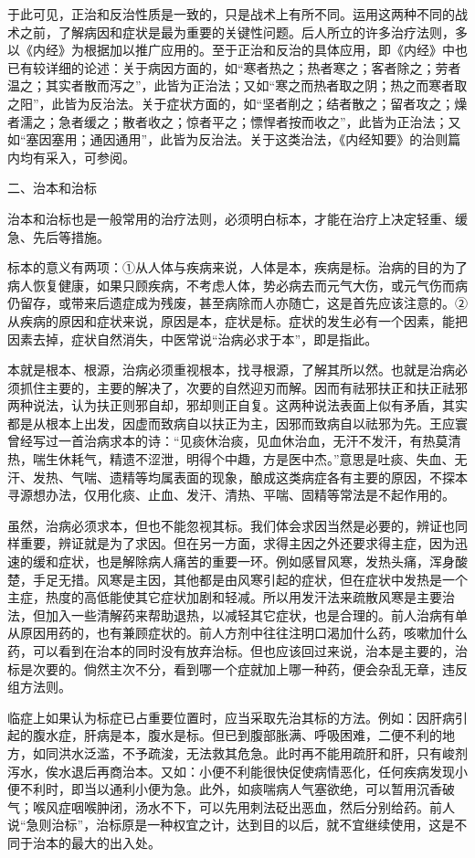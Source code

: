 \documentclass[12pt,UTF8]{ctexbook}
\begin{document}
于此可见，正治和反治性质是一致的，只是战术上有所不同。运用这两种不同的战术之前，了解病因和症状是最为重要的关键性问题。后人所立的许多治疗法则，多以《内经》为根据加以推广应用的。至于正治和反治的具体应用，即《内经》中也已有较详细的论述：关于病因方面的，如“寒者热之；热者寒之；客者除之；劳者温之；其实者散而泻之”，此皆为正治法；又如“寒之而热者取之阴；热之而寒者取之阳”，此皆为反治法。关于症状方面的，如“坚者削之；结者散之；留者攻之；燥者濡之；急者缓之；散者收之；惊者平之；慓悍者按而收之”，此皆为正治法；又如“塞因塞用；通因通用”，此皆为反治法。关于这类治法，《内经知要》的治则篇内均有采入，可参阅。

二、治本和治标

治本和治标也是一般常用的治疗法则，必须明白标本，才能在治疗上决定轻重、缓急、先后等措施。

标本的意义有两项：①从人体与疾病来说，人体是本，疾病是标。治病的目的为了病人恢复健康，如果只顾疾病，不考虑人体，势必病去而元气大伤，或元气伤而病仍留存，或带来后遗症成为残废，甚至病除而人亦随亡，这是首先应该注意的。②从疾病的原因和症状来说，原因是本，症状是标。症状的发生必有一个因素，能把因素去掉，症状自然消失，中医常说“治病必求于本”，即是指此。

本就是根本、根源，治病必须重视根本，找寻根源，了解其所以然。也就是治病必须抓住主要的，主要的解决了，次要的自然迎刃而解。因而有祛邪扶正和扶正祛邪两种说法，认为扶正则邪自却，邪却则正自复。这两种说法表面上似有矛盾，其实都是从根本上出发，因虚而致病自以扶正为主，因邪而致病自以祛邪为先。王应寰曾经写过一首治病求本的诗：“见痰休治痰，见血休治血，无汗不发汗，有热莫清热，喘生休耗气，精遗不涩泄，明得个中趣，方是医中杰。”意思是吐痰、失血、无汗、发热、气喘、遗精等均属表面的现象，酿成这类病症各有主要的原因，不探本寻源想办法，仅用化痰、止血、发汗、清热、平喘、固精等常法是不起作用的。

虽然，治病必须求本，但也不能忽视其标。我们体会求因当然是必要的，辨证也同样重要，辨证就是为了求因。但在另一方面，求得主因之外还要求得主症，因为迅速的缓和症状，也是解除病人痛苦的重要一环。例如感冒风寒，发热头痛，浑身酸楚，手足无措。风寒是主因，其他都是由风寒引起的症状，但在症状中发热是一个主症，热度的高低能使其它症状加剧和轻减。所以用发汗法来疏散风寒是主要治法，但加入一些清解药来帮助退热，以减轻其它症状，也是合理的。前人治病有单从原因用药的，也有兼顾症状的。前人方剂中往往注明口渴加什么药，咳嗽加什么药，可以看到在治本的同时没有放弃治标。但也应该回过来说，治本是主要的，治标是次要的。倘然主次不分，看到哪一个症就加上哪一种药，便会杂乱无章，违反组方法则。

临症上如果认为标症已占重要位置时，应当采取先治其标的方法。例如：因肝病引起的腹水症，肝病是本，腹水是标。但已到腹部胀满、呼吸困难，二便不利的地方，如同洪水泛滥，不予疏浚，无法救其危急。此时再不能用疏肝和肝，只有峻剂泻水，俟水退后再商治本。又如：小便不利能很快促使病情恶化，任何疾病发现小便不利时，即当以通利小便为急。此外，如痰喘病人气塞欲绝，可以暂用沉香破气；喉风症咽喉肿闭，汤水不下，可以先用刺法砭出恶血，然后分别给药。前人说“急则治标”，治标原是一种权宜之计，达到目的以后，就不宜继续使用，这是不同于治本的最大的出入处。
\end{document}

